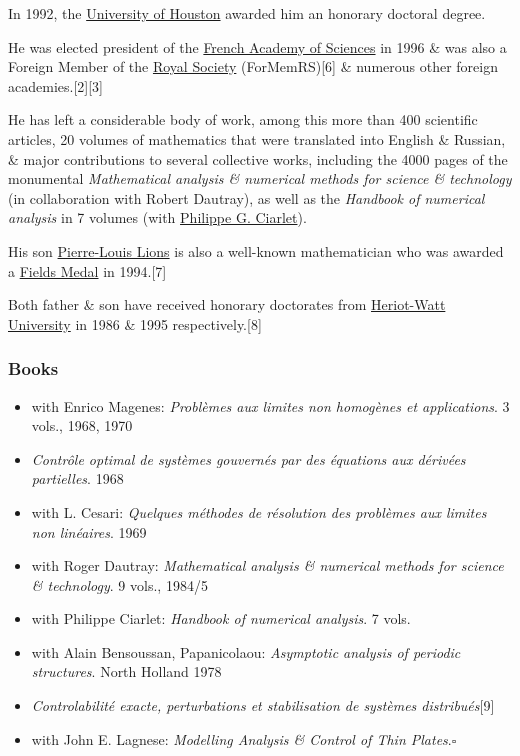 \documentclass{article}
\begin{document}
In 1992, the \href{https://en.wikipedia.org/wiki/University_of_Houston}{University of Houston} awarded him an honorary doctoral degree.

He was elected president of the \href{https://en.wikipedia.org/wiki/French_Academy_of_Sciences}{French Academy of Sciences} in 1996 \& was also a Foreign Member of the \href{https://en.wikipedia.org/wiki/Royal_Society}{Royal Society} (ForMemRS)[6] \& numerous other foreign academies.[2][3]

%
He has left a considerable body of work, among this more than 400 scientific articles, 20 volumes of mathematics that were translated into English \& Russian, \& major contributions to several collective works, including the 4000 pages of the monumental \textit{Mathematical analysis \& numerical methods for science \& technology} (in collaboration with Robert Dautray), as well as the \textit{Handbook of numerical analysis} in 7 volumes (with \href{https://en.wikipedia.org/wiki/Philippe_G._Ciarlet}{Philippe G. Ciarlet}).

%
His son \href{https://en.wikipedia.org/wiki/Pierre-Louis_Lions}{Pierre-Louis Lions} is also a well-known mathematician who was awarded a \href{https://en.wikipedia.org/wiki/Fields_Medal}{Fields Medal} in 1994.[7]

Both father \& son have received honorary doctorates from \href{https://en.wikipedia.org/wiki/Heriot-Watt_University}{Heriot-Watt University} in 1986 \& 1995 respectively.[8]

\subsubsection{Books}
\begin{itemize}
	\item with Enrico Magenes: \textit{Problèmes aux limites non homogènes et applications}. 3 vols., 1968, 1970
	\item \textit{Contrôle optimal de systèmes gouvernés par des équations aux dérivées partielles}. 1968
	\item with L. Cesari: \textit{Quelques méthodes de résolution des problèmes aux limites non linéaires}. 1969
	\item with Roger Dautray: \textit{Mathematical analysis \& numerical methods for science \& technology}. 9 vols., 1984/5
	\item with Philippe Ciarlet: \textit{Handbook of numerical analysis}. 7 vols.
	\item with Alain Bensoussan, Papanicolaou: \textit{Asymptotic analysis of periodic structures}. North Holland 1978
	\item \textit{Controlabilité exacte, perturbations et stabilisation de systèmes distribués}[9]
	\item with John E. Lagnese: \textit{Modelling Analysis \& Control of Thin Plates}.\hfill$\square$
\end{itemize}
\end{document}

